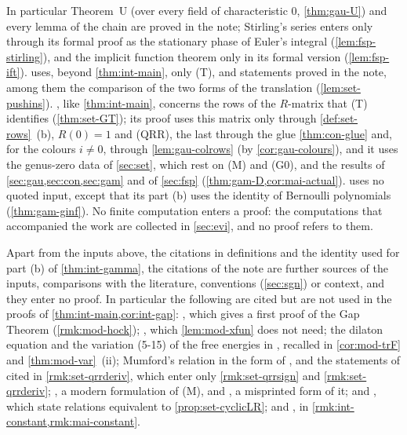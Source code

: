 In particular Theorem~U (over every field of characteristic $0$, \cref{thm:gau-U}) and every lemma of the chain are proved in the note; Stirling's series enters only through its formal proof as the stationary phase of Euler's integral (\cref{lem:fsp-stirling}), and the implicit function theorem only in its formal version (\cref{lem:fsp-ift}).  uses, beyond \cref{thm:int-main}, only (T), \cite[\S0.2, (1); Def.~0.3; (5); Remark~2.1; Defs.~2.2 and~2.5, with the conventions stated after them; (8); Prop.~2.12; Def.~2.13; Prop.~2.14, with Props.~2.4, 2.8 and~2.9 through its proof]{PPZ15} and statements proved in the note, among them the comparison of the two forms of the translation (\cref{lem:set-pushins}). , like \cref{thm:int-main}, concerns the rows of the $R$-matrix that (T) identifies (\cref{thm:set-GT}); its proof uses this matrix only through \cref{def:set-rows}~(b), $R(0)=1$ and (QRR), the last through the glue \cref{thm:con-glue} and, for the colours $i\neq0$, through \cref{lem:gau-colrows} (by \cref{cor:gau-colours}), and it uses the genus-zero data of \cref{sec:set}, which rest on (M) and (G0), and the results of \cref{sec:gau,sec:con,sec:gam} and of \cref{sec:fsp} (\cref{thm:gam-D,cor:mai-actual}).  uses no quoted input, except that its part (b) uses the identity \cite[24.4.1]{DLMF} of Bernoulli polynomials (\cref{thm:gam-ginf}). No finite computation enters a proof: the computations that accompanied the work are collected in \cref{sec:evi}, and no proof refers to them.

Apart from the inputs above, the citations in definitions and the identity \cite[24.4.1]{DLMF} used for part (b) of \cref{thm:int-gamma}, the citations of the note are further sources of the inputs, comparisons with the literature, conventions (\cref{sec:sgn}) or context, and they enter no proof. In particular the following are cited but are not used in the proofs of \cref{thm:int-main,cor:int-gap}: \cite[Corollary~1.2]{Hock25}, which gives a first proof of the Gap Theorem (\cref{rmk:mod-hock}); \cite[Theorem~4.4, (4-23)--(4-24); Corollary~4.1, (4-26)--(4-29); (A-25)]{Eynard:2007kz}, which \cref{lem:mod-xfun} does not need; the dilaton equation \cite[Theorem~4.7, (4-30)]{Eynard:2007kz} and the variation (5-15) of the free energies in \cite[Theorem~5.1]{Eynard:2007kz}, recalled in \cref{cor:mod-trF} and \cref{thm:mod-var}~(ii); Mumford's relation in the form of \cite[\S2.1]{MR1728879}, \cite[(26)]{LP20} and the statements of \cite[\S8]{MR2917177} cited in \cref{rmk:set-qrrderiv}, which enter only \cref{rmk:set-qrrsign} and \cref{rmk:set-qrrderiv}; \cite[Theorem~2]{MR2276766}, a modern formulation of (M), and \cite[Corollary~11.7]{MR1408320}, a misprinted form of it; \cite[Props.~6.1--6.2]{GR19} and \cite[\S2.4.3, (17); \S2.4.4, (19)--(20)]{LP20}, which state relations equivalent to \cref{prop:set-cyclicLR}; and \cite{CGYZ26}, in \cref{rmk:int-constant,rmk:mai-constant}.

